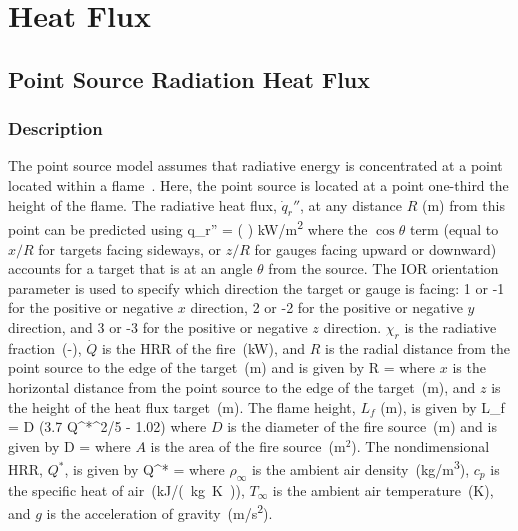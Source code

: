 
\chapter{Heat Flux}
\label{Heat_Flux_Chapter}

\section{Point Source Radiation Heat Flux}

\subsection*{Description}

The point source model assumes that radiative energy is concentrated at a point located within a flame~\cite{Beyler2:SFPE}.
Here, the point source is located at a point one-third the height of the flame.
The radiative heat flux, $\dot q_r''$, at any distance $R$ (\si{m}) from this point can be predicted using
\be
\dot q_r'' = \cos\theta \left(  \right) \quad \si{kW/m^2}
\label{eq:point_source}
\ee
where the $\cos\theta$ term (equal to $x/R$ for targets facing sideways, or $z/R$ for gauges facing upward or downward) accounts for a target that is at an angle $\theta$ from the source. The IOR orientation parameter is used to specify which direction the target or gauge is facing: 1 or -1 for the positive or negative $x$ direction, 2 or -2 for the positive or negative $y$ direction, and 3 or -3 for the positive or negative $z$ direction. $\chi_r$ is the radiative fraction~(-), $\dot Q$ is the HRR of the fire~(\si{kW}), and $R$ is the radial distance from the point source to the edge of the target~(\si{m}) and is given by
\be
R = 
\label{eq:point_source_R}
\ee
where $x$ is the horizontal distance from the point source to the edge of the target~(\si{m}), and $z$ is the height of the heat flux target~(\si{m}). The flame height, $L_f$ (\si{m}), is given by
\be
L_f = D (3.7 Q^{*^{2/5}} - 1.02)
\label{eq:point_source_Lf}
\ee
where $D$ is the diameter of the fire source~(\si{m}) and is given by
\be
D = 
\label{eq:point_source_D}
\ee
where $A$ is the area of the fire source~(m$^2$). The nondimensional HRR, $Q^*$, is given by
\be
Q^* = 
\label{eq:point_source_Qstar}
\ee
where $\rho_\infty$ is the ambient air density~(\si{kg/m^3}), $c_p$ is the specific heat of air~(\si{kJ/(kg.K)}), $T_\infty$ is the ambient air temperature~(\si{K}), and $g$ is the acceleration of gravity~(\si{m/s^2}).

